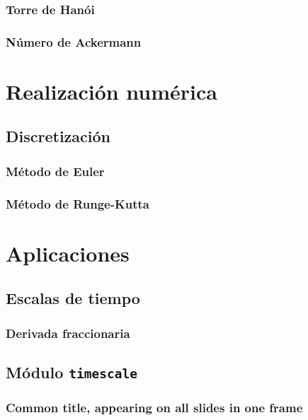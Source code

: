 \documentclass[spanish, utf8,handout]{beamer} %
\theoremstyle{definition}
\begin{document}
\subsubsection{Torre de Hanói}
\subsubsection{Número de Ackermann}

\section{Realización numérica}

\subsection{Discretización}
\subsubsection{Método de Euler}
\subsubsection{Método de Runge-Kutta}

\section{Aplicaciones}

\subsection{Escalas de tiempo}
\subsubsection{Derivada fraccionaria}
\subsection{Módulo \texttt{timescale}}

\begin{frame}
	\frametitle{Common title, appearing on all slides in one frame}
\end{frame}
\end{document}
